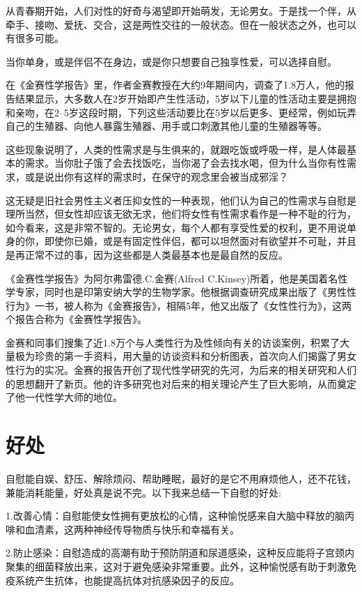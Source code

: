 \documentclass[12pt,UTF8]{ctexbook}
\begin{document}
从青春期开始，人们对性的好奇与渴望即开始萌发，无论男女。于是找一个伴，从牵手、接吻、爱抚、交合，这是两性交往的一般状态。但在一般状态之外，也可以有很多可能。

当你单身，或是伴侣不在身边，或是你只想要自己独享性爱，可以选择自慰。

在《金赛性学报告》里，作者金赛教授在大约9年期间内，调查了1.8万人，他的报告结果显示，大多数人在2岁开始即产生性活动，5岁以下儿童的性活动主要是拥抱和亲吻，在2--5岁这段时期，下列这些活动要比在5岁以后更多、更经常，例如玩弄自己的生殖器、向他人暴露生殖器、用手或口刺激其他儿童的生殖器等等。

这些现象说明了，人类的性需求是与生俱来的，就跟吃饭或呼吸一样，是人体最基本的需求。当你肚子饿了会去找饭吃，当你渴了会去找水喝，但为什么当你有性需求，或是说出你有这样的需求时，在保守的观念里会被当成邪淫？

这无疑是旧社会男性主义者压抑女性的一种表现，他们认为自己的性需求与自慰是理所当然，但女性却应该无欲无求，他们将女性有性需求看作是一种不耻的行为，如今看来，这是非常不智的。无论男女，每个人都有享受性爱的权利，更不用说单身的你，即使你已婚，或是有固定性伴侣，都可以坦然面对有欲望并不可耻，并且是再正常不过的事，因为这些都是人类最基本也是最自然的反应。

《金赛性学报告》为阿尔弗雷德.C.金赛(Alfred C.Kinsey)所着，他是美国着名性学专家，同时也是印第安纳大学的生物学家。他根据调查研究成果出版了《男性性行为》一书，被人称为《金赛报告》，相隔5年，他又出版了《女性性行为》，这两个报告合称为《金赛性学报告》。

金赛和同事们搜集了近1.8万个与人类性行为及性倾向有关的访谈案例，积累了大量极为珍贵的第一手资料，用大量的访谈资料和分析图表，首次向人们揭露了男女性行为的实况。金赛的报告开创了现代性学研究的先河，为后来的相关研究和人们的思想翻开了新页。他的许多研究也对后来的相关理论产生了巨大影响，从而奠定了他一代性学大师的地位。

\section{好处}

自慰能自娱、舒压、解除烦闷、帮助睡眠，最好的是它不用麻烦他人，还不花钱，兼能消耗能量，好处真是说不完。以下我来总结一下自慰的好处:

1.改善心情：自慰能使女性拥有更放松的心情，这种愉悦感来自大脑中释放的脑丙啡和血清素，这两种神经传导物质与快乐和幸福有关。

2.防止感染：自慰造成的高潮有助于预防阴道和尿道感染，这种反应能将子宫颈内聚集的细菌释放出来，这对于避免感染非常重要。此外，这种愉悦感有助于刺激免疫系统产生抗体，也能提高抗体对抗感染因子的反应。
\end{document}
